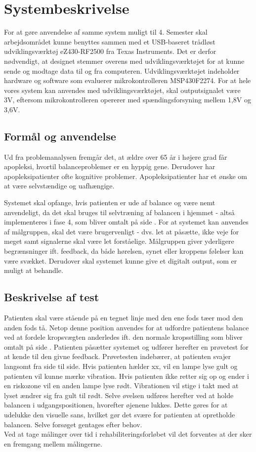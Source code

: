 \section{Systembeskrivelse}
For at gøre anvendelse af samme system muligt til 4. Semester skal arbejdsområdet kunne benyttes sammen med et USB-baseret trådløst udviklingsværktøj eZ430-RF2500 fra Texas Instruments. Det er derfor nødvendigt, at designet stemmer overens med udviklingsværktøjet for at kunne sende og modtage data til og fra computeren. Udviklingsværktøjet indeholder hardware og software som evaluerer mikrokontrolleren MSP430F2274. For at hele vores system kan anvendes med udviklingsværktøjet, skal outputsignalet være 3V, eftersom mikrokontrolleren opererer med spændingsforsyning mellem 1,8V og 3,6V.  

\subsection{Formål og anvendelse}
Ud fra problemanalysen fremgår det, at ældre over 65 år i højere grad får apopleksi, hvortil balanceproblemer er en hyppig gene. Derudover har apopleksipatienter ofte kognitive problemer. Apopleksipatienter har et ønske om at være selvstændige og uafhængige. 

Systemet skal opfange, hvis patienten er ude af balance og være nemt anvendeligt, da det skal bruges til selvtræning af balancen i hjemmet - altså implementeres i fase 4, som bliver omtalt på side \pageref{Faser}. For at systemet kan anvendes af målgruppen, skal det være brugervenligt - dvs. let at påsætte, ikke veje for meget samt signalerne skal være let forståelige. Målgruppen giver yderligere begrænsninger ift. feedback, da både hørelsen, synet eller kroppens følelser kan være svækket. Derudover skal systemet kunne give et digitalt output, som er muligt at behandle.


\subsection{Beskrivelse af test}
Patienten skal være stående på en tegnet linje med den ene fods tæer mod den anden fods tå. Netop denne position anvendes for at udfordre patientens balance ved at fordele kropsvægten anderledes ift. den normale kropsstilling som bliver omtalt på side \pageref{BalanceAfsnit}. Patienten påsætter systemet og udfører herefter en prøvetest for at kende til den givne feedback. Prøvetesten indebærer, at patienten svajer langsomt fra side til side. Hvis patienten hælder xx, vil en lampe lyse gult og patienten vil kunne mærke vibration. Hvis patienten ikke retter sig op og ender i en riskozone vil en anden lampe lyse rødt. Vibrationen vil stige i takt med at lyset ændrer sig fra gult til rødt. Selve øvelsen udføres herefter ved at holde balancen i udgangspositionen, hvorefter øjenene lukkes. Dette gøres for at udelukke den visuelle sans, hvilket gør det svære for patienten at opretholde balancen. Selve forsøget gentages efter behov. \\
Ved at tage målinger over tid i rehabiliteringsforløbet vil det forventes at der sker en fremgang mellem målingerne. 

